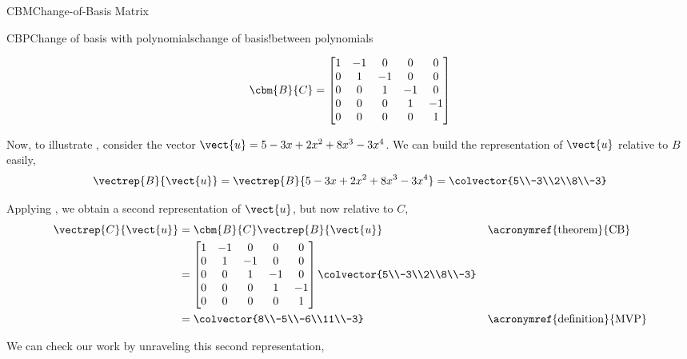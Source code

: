 \begin{subsect}{CBM}{Change-of-Basis Matrix}
\begin{example}{CBP}{Change of basis with polynomials}{change of basis!between polynomials}
\begin{para}
\begin{equation*}
\cbm{B}{C}=
\begin{bmatrix}
1 &-1 & 0 & 0 & 0\\
0 & 1 &-1 & 0 & 0\\
0 & 0 & 1 &-1 & 0\\
0 & 0 & 0 & 1 &-1\\
0 & 0 & 0 & 0 & 1\\
\end{bmatrix}
\end{equation*}
\end{para}
%
\begin{para}Now, to illustrate , consider the vector $\vect{u}=5-3x+2x^2+8x^3-3x^4$.  We can build the representation of $\vect{u}$ relative to $B$ easily,
%
\begin{equation*}
%
\vectrep{B}{\vect{u}}=
\vectrep{B}{5-3x+2x^2+8x^3-3x^4}=
\colvector{5\\-3\\2\\8\\-3}
%
\end{equation*}
\end{para}
%
\begin{para}Applying , we obtain a second representation of $\vect{u}$, but now relative to $C$,
%
\begin{align*}
\vectrep{C}{\vect{u}}
&=\cbm{B}{C}\vectrep{B}{\vect{u}}&&\text{\acronymref{theorem}{CB}}\\
%
&=
\begin{bmatrix}
1 &-1 & 0 & 0 & 0\\
0 & 1 &-1 & 0 & 0\\
0 & 0 & 1 &-1 & 0\\
0 & 0 & 0 & 1 &-1\\
0 & 0 & 0 & 0 & 1\\
\end{bmatrix}
\colvector{5\\-3\\2\\8\\-3}\\
%
&=\colvector{8\\-5\\-6\\11\\-3}&&\text{\acronymref{definition}{MVP}}
%
\end{align*}
\end{para}
%
\begin{para}We can check our work by unraveling this second representation,

\end{para}
\end{example}
\end{subsect}
